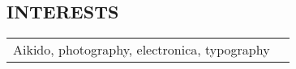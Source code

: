 \documentclass[margin, line]{res}
\begin{document}
\begin{resume}
\section{INTERESTS}
	\begin{tabular} {p{6in} r}
	Aikido, photography, electronica, typography
 	\end{tabular}
\end{resume} 
\end{document}
